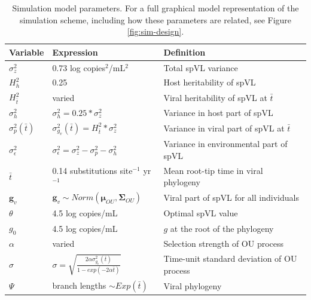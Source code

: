 \documentclass[12pt]{article} %
\providecommand{\DIFadd}[1]{{\protect\color{blue}\uwave{#1}}} %
\providecommand{\DIFdel}[1]{{\protect\color{red}\sout{#1}}}                      %
\providecommand{\DIFdelend}{} %
\providecommand{\DIFaddFL}[1]{\DIFadd{#1}} %
\providecommand{\DIFdelFL}[1]{\DIFdel{#1}} %
\providecommand{\DIFaddbeginFL}{} %
\providecommand{\DIFaddendFL}{} %
\providecommand{\DIFdelbeginFL}{} %
\providecommand{\DIFdelendFL}{} %
\newcommand{\DIFscaledelfig}{0.5}
\newlength{\DIFdelgraphicswidth} %
\newlength{\DIFdelgraphicsheight} %
\newcommand{\DIFaddincludegraphics}[2][]{{\color{blue}\fbox{\DIFOincludegraphics[#1]{#2}}}} %
\newcommand{\DIFdelincludegraphics}[2][]{%
\sbox{\DIFdelgraphicsbox}{\DIFOincludegraphics[#1]{#2}}%
\settoboxwidth{\DIFdelgraphicswidth}{\DIFdelgraphicsbox} %
\settoboxtotalheight{\DIFdelgraphicsheight}{\DIFdelgraphicsbox} %
\scalebox{\DIFscaledelfig}{%
\parbox[b]{\DIFdelgraphicswidth}{\usebox{\DIFdelgraphicsbox}\\[-\baselineskip] \rule{\DIFdelgraphicswidth}{0em}}\llap{\resizebox{\DIFdelgraphicswidth}{\DIFdelgraphicsheight}{%
\setlength{\unitlength}{\DIFdelgraphicswidth}%
\begin{picture}(1,1)%
\thicklines\linethickness{2pt} %
{\color[rgb]{1,0,0}\put(0,0){\framebox(1,1){}}}%
{\color[rgb]{1,0,0}\put(0,0){\line( 1,1){1}}}%
{\color[rgb]{1,0,0}\put(0,1){\line(1,-1){1}}}%
\end{picture}%
}\hspace*{3pt}}} %
} %
\DeclareRobustCommand{\DIFdelend}{\DIFOaddend \let\includegraphics\DIFOincludegraphics} %
\DeclareRobustCommand{\DIFaddbeginFL}{\DIFOaddbeginFL \let\includegraphics\DIFaddincludegraphics} %
\DeclareRobustCommand{\DIFaddendFL}{\DIFOaddendFL \let\includegraphics\DIFOincludegraphics} %
\DeclareRobustCommand{\DIFdelbeginFL}{\DIFOdelbeginFL \let\includegraphics\DIFdelincludegraphics} %
\DeclareRobustCommand{\DIFdelendFL}{\DIFOaddendFL \let\includegraphics\DIFOincludegraphics} %
\begin{document}
\begin{doublespace}
\DIFdelend \begin{table}[H]
	\caption{Simulation model parameters. For a full graphical model representation of the simulation scheme, including how these parameters are related, see Figure \ref{fig:sim-design}.}
	\begin{tabularx}{\linewidth}{p{1.5cm}ll} \toprule 
		Variable & Expression & Definition \\ \midrule 
		$\sigma^2_z$ &  0.73 log copies$^{2}$/mL$^{2}$ & Total spVL variance \\ 
		$H^2_h$ & 0.25 & Host heritability of spVL \\
		$H^2_{\bar{t}}$ & varied & Viral heritability of spVL at $\bar{t}$ \\
		\DIFdelbeginFL \DIFdelFL{$\sigma^2_{h}$ }\DIFdelendFL \DIFaddbeginFL \DIFaddFL{$\sigma^2_{g_h}$ }\DIFaddendFL & \DIFdelbeginFL \DIFdelFL{$\sigma_{h}^2 = 0.25*\sigma_z^2$ }\DIFdelendFL \DIFaddbeginFL \DIFaddFL{$\sigma_{g_h}^2 = 0.25*\sigma_z^2$ }\DIFaddendFL & Variance in host part of spVL \\
		\DIFdelbeginFL \DIFdelFL{$\sigma^2_{p}(\bar{t})$ }\DIFdelendFL \DIFaddbeginFL \DIFaddFL{$\sigma^2_{g_v}(\bar{t})$ }\DIFaddendFL & $\sigma^2_{g_{v}}(\bar{t}) = H^2_{\bar{t}}*\sigma_z^2$ & Variance in viral part of spVL at $\bar{t}$ \\ 
		$\sigma^2_{\epsilon}$ & \DIFdelbeginFL \DIFdelFL{$\sigma_{\epsilon}^2 = \sigma_z^2 - \sigma^2_{p} - \sigma^2_{h}$ }\DIFdelendFL \DIFaddbeginFL \DIFaddFL{$\sigma_{\epsilon}^2 = \sigma_z^2 - \sigma^2_{g_v} - \sigma^2_{g_h}$ }\DIFaddendFL & Variance in environmental part of spVL \\ 
		$\bar{t}$ & 0.14 substitutions site$^{-1}$ yr$^{-1}$ & Mean root-tip time in viral phylogeny \\ 
		$\bm{g}_v$ & $\bm{g}_v \sim Norm(\bm{\mu}_{OU}, \boldsymbol{\Sigma}_{OU})$ & Viral part of spVL for all individuals \\ 
		$\theta$ & 4.5 log copies/mL & Optimal spVL value \\
		$g_{0}$ & 4.5 log copies/mL & \DIFdelbeginFL \DIFdelFL{$g$ }\DIFdelendFL \DIFaddbeginFL \DIFaddFL{$g_v$ }\DIFaddendFL at the root of the phylogeny  \\ 
		$\alpha$ & varied & Selection strength of OU process \\ 
		$\sigma$ & $\sigma = \sqrt{\frac{2\alpha\sigma^2_{g_{v}}(\bar{t})}{1 - exp(-2\alpha\bar{t})}}$ & Time-unit standard deviation of OU process \\ 
		$\Psi$ & branch lengths $\sim Exp(\bar{t})$ & Viral phylogeny \\ 

\end{tabularx}
\end{table}
\end{doublespace}
\end{document}
